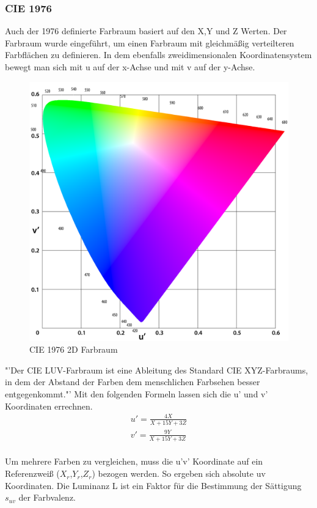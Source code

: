 \documentclass[11pt]{scrartcl}
\begin{document}
\subsubsection{CIE 1976}
Auch der 1976 definierte Farbraum basiert auf den X,Y und Z Werten. Der Farbraum wurde eingeführt, um einen Farbraum mit gleichmäßig
verteilteren Farbflächen zu definieren. In dem ebenfalls zweidimensionalen Koordinatensystem bewegt man sich mit u auf der x-Achse und mit
v auf der y-Achse.
\begin{figure}[H]
    \begin{center}
        \includegraphics[width=.7\textwidth]{images/cie_1976.png}
    \end{center}
    \caption[CIE 1976 2D Farbraum]{CIE 1976 2D Farbraum \cite{wikipedia1976}}
\end{figure}
\noindent
"'Der CIE LUV-Farbraum ist eine Ableitung des Standard CIE XYZ-Farbraums, in dem der Abstand der Farben dem menschlichen Farbsehen besser
entgegenkommt."' \cite{wisotopLuv} Mit den folgenden Formeln lassen sich die u' und v' Koordinaten errechnen.
\begin{align}\label{Equ:9}
    u' = \frac{4X}{X+15Y+3Z}\\
    v' = \frac{9Y}{X+15Y+3Z}
\end{align}
\cite{lindbloom}\\
Um mehrere Farben zu vergleichen, muss die u'v' Koordinate auf ein Referenzweiß ($X_r$,$Y_r$,$Z_r$) bezogen werden. So ergeben sich
absolute uv Koordinaten. Die Luminanz L ist ein Faktor für die Bestimmung der Sättigung $s_{uv}$ der Farbvalenz.\\
\cite{wikipedia1976}
\end{document}
